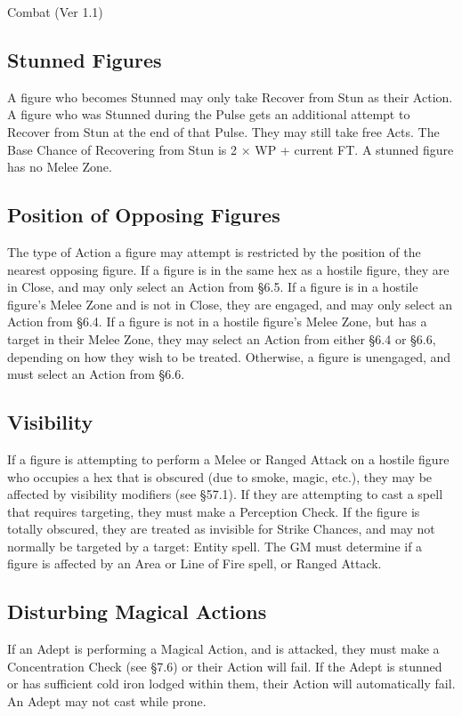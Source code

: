 \begin{Chapter}{Combat (Ver 1.1)}
\subsection{Stunned Figures}

A figure who becomes Stunned may only take Recover from Stun as their
Action.  A figure who was Stunned during the Pulse gets an additional
attempt to Recover from Stun at the end of that Pulse.  They may still
take free Acts.  The Base Chance of Recovering from Stun is 2 × WP +
current FT.  A stunned figure has no Melee Zone.

\subsection{Position of Opposing Figures}

The type of Action a figure may attempt is restricted by the position
of the nearest opposing figure.  If a figure is in the same hex as a
hostile figure, they are in Close, and may only select an Action from
§6.5. If a figure is in a hostile figure’s Melee Zone and is not in
Close, they are engaged, and may only select an Action from §6.4.  If
a figure is not in a hostile figure’s Melee Zone, but has a target in
their Melee Zone, they may select an Action from either §6.4 or §6.6,
depending on how they wish to be treated.  Otherwise, a figure is
unengaged, and must select an Action from §6.6.

\subsection{Visibility}

If a figure is attempting to perform a Melee or Ranged Attack on a
hostile figure who occupies a hex that is obscured (due to smoke,
magic, etc.), they may be affected by visibility modifiers (see
§57.1).  If they are attempting to cast a spell that requires
targeting, they must make a Perception Check.  If the figure is
totally obscured, they are treated as invisible for Strike Chances,
and may not normally be targeted by a target: Entity spell.  The GM
must determine if a figure is affected by an Area or Line of Fire
spell, or Ranged Attack.

\subsection{Disturbing Magical Actions}

If an Adept is performing a Magical Action, and is attacked, they must
make a Concentration Check (see §7.6) or their Action will fail.  If
the Adept is stunned or has sufficient cold iron lodged within them,
their Action will automatically fail.  An Adept may not cast while
prone.


\end{Chapter}
